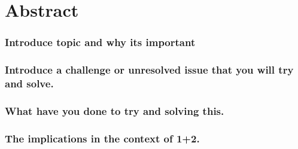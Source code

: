 \chapter*{Abstract}

\subsection*{Introduce topic and why its important}

\subsection*{Introduce a challenge or unresolved issue that you will try and solve.} 

\subsection*{What have you done to try and solving this.}


\subsection*{The implications in the context of 1+2.}
\cleardoublepage